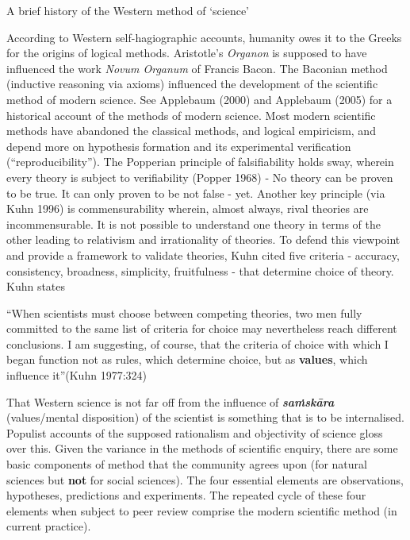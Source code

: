 \newpage

A brief history of the Western method of `science'

According to Western self-hagiographic accounts, humanity owes it to the Greeks for the origins of logical methods. Aristotle's {\sl Organon} is supposed to have influenced the work {\sl Novum Organum} of Francis Bacon. The Baconian method (inductive reasoning via axioms) influenced the development of the scientific method of modern science. See Applebaum (2000) and Applebaum (2005) for a historical account of the methods of modern science. Most modern scientific methods have abandoned the classical methods, and logical empiricism, and depend more on hypothesis formation and its experimental verification (``reproducibility''). The Popperian principle of falsifiability holds sway, wherein every theory is subject to verifiability (Popper 1968) - No theory can be proven to be true. It can only proven to be not false - yet.  Another key principle (via Kuhn 1996) is commensurability wherein, almost always, rival theories are incommensurable. It is not possible to understand one theory in terms of the other leading to relativism and irrationality of theories. To defend this viewpoint and provide a framework to validate theories, Kuhn cited five criteria - accuracy, consistency, broadness, simplicity, fruitfulness - that determine choice of theory. Kuhn states 
\begin{myquote}
``When scientists must choose between competing theories, two men fully committed to the same list of criteria for choice may nevertheless reach different conclusions. I am suggesting, of course, that the criteria of choice with which I began function not as rules, which determine choice, but as {\bf values}, which influence it''\hfill (Kuhn 1977:324)
\end{myquote}

That Western science is not far off from the influence of {{\sl\bfseries saṁskāra}\relax} (values/mental disposition) of the scientist is something that is to be internalised. Populist accounts of the supposed rationalism and objectivity of science gloss over this. Given the variance in the methods of scientific enquiry, there are some basic components of method that the community agrees upon (for natural sciences but {\bf not} for social sciences). The four essential elements are observations, hypotheses, predictions and experiments. The repeated cycle of these four elements when subject to peer review comprise the modern scientific method (in current practice).

